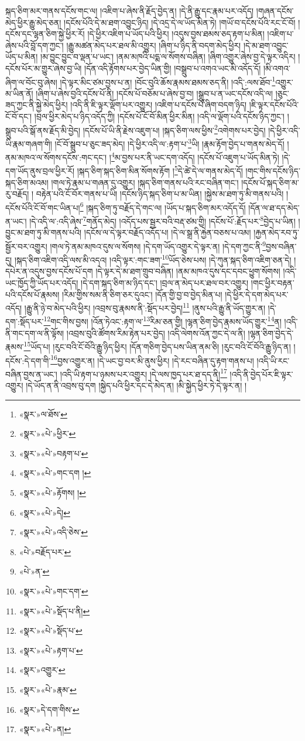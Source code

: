 སྐད་ཅིག་མར་གནས་དངོས་གང་ལ། །འཇིག་པ་ཞེས་ནི་རྗོད་བྱེད་ན། །དེ་ནི་རྒྱུ་དང་རྣམ་པར་འདོད། །གཞན་དངོས་མེད་ཕྱིར་རྒྱུ་མེད་ཅན། །དངོས་པོའི་དེ་མ་ཐག་འབྱུང་ཉིད། །དེ་འདྲ་དེ་ལ་ཡོད་མིན་ཏེ། །གཡོ་བ་དངོས་པོའི་རང་ངོ་བོ། །དངོས་དང་ལྷན་ཅིག་སྐྱེ་ཕྱིར་རོ། །དེ་ཕྱིར་འཇིག་པ་ཡོད་པའི་ཕྱིར། །འདུས་བྱས་ཐམས་ཅད་རྟག་པ་མིན། །འཇིག་པ་ཞེས་པའི་བློ་དག་ཀྱང་། །རྒྱུ་མཚན་མེད་པར་ཐལ་མི་འགྱུར། །ཞིག་པ་ཉིད་ནི་བདག་མེད་ཕྱིར། །དེ་མ་ཐག་འབྱུང་ཡོད་པ་མིན། །མ་བྱུང་བྱུང་བ་ལྡན་པ་ཡང་། །ནམ་མཁའི་པདྨ་ལ་སོགས་བཞིན། །ཞིག་འགྱུར་ཞེས་བྱ་དེ་ལྟར་འདིར། །དངོས་པོར་མ་གྱུར་ཞེས་བྱ་ཡི། །དོན་འདི་རྟོགས་པར་བྱེད་ཡིན་གྱི། །བསྒྲུབ་པ་འགའ་ཡང་མི་འདོད་དོ། །མི་འགའ་ཞིག་ལ་བོང་བུ་ཞེས། །དེ་ལྟར་མིང་ཙམ་བྱས་པ་ན། །བོང་བུའི་ཆོས་རྣམས་ཐམས་ཅད་ནི། །འདི་:ལས་ཐོབ་\footnote{«སྣར་»ལ་ཐོས་}འགྱུར་མ་ཡིན་ནོ། །ཞིག་པ་ཞེས་བྱའི་དངོས་པོ་ནི། །དངོས་པོ་བཅོམ་པ་ཞེས་བྱ་བ། །སྒྲུབ་པ་ན་ཡང་དངོས་འདི་ལ། །ཅུང་ཟད་ཀྱང་ནི་སྐྱེ་མེད་ཕྱིར། །འདི་ནི་ཇི་ལྟར་ལྡོག་པར་འགྱུར། །འཇིག་པ་དངོས་པོ་ཞིག་བདག་ཉིད། །ཇི་ལྟར་དངོས་པོའི་ངོ་བོ་དང་། །བྲལ་ཕྱིར་མེད་པ་ཉིད་འདོད་ཀྱི། །དངོས་པོ་ངོ་བོ་མིན་ཕྱིར་མིན། །འདི་ལ་ལྡོག་པའི་དངོས་ཉིད་ཀྱང་། །སྒྲུབ་པའི་སྒོ་ནས་རྗོད་མི་བྱེད། །དངོས་པོ་ཡི་ནི་རྗེས་འཇུག་པ། །སྐད་ཅིག་ལས་ཕྱིས་\footnote{«སྣར་»«པེ་»ཕྱིར་}འགེགས་པར་བྱེད། །དེ་ཕྱིར་འདི་ཡི་རྣམ་གཞག་གི། །ངོ་བོ་སྒྲུབ་པ་ཅུང་ཟད་མེད། །དེ་ཕྱིར་འདི་ལ་:རྟག་པ་\footnote{«སྣར་»«པེ་»བརྟག་པ་}ཡི། །རྣམ་རྟོག་བྱེད་པ་གནས་མེད་དོ། །ནམ་མཁའ་ལ་སོགས་དངོས་:གང་དང་། །\footnote{«སྣར་»«པེ་»གང་དག །}མ་བྱས་པར་ནི་ཡང་དག་འདོད། །དངོས་པོ་འཇུག་པ་ཡོད་མིན་ཏེ། །དེ་དག་ཡོད་ནུས་བྲལ་ཕྱིར་རོ། །སྐད་ཅིག་སྐད་ཅིག་མིན་སོགས་རྟོག །\footnote{«སྣར་»«པེ་»རྟོགས། །}དེ་ཚེ་དེ་ལ་གནས་མེད་དོ། །གང་གིས་དངོས་ཉིད་སྐད་ཅིག་མའམ། །གལ་ཏེ་རྣམ་པ་གཞན་དུ་འགྱུར། །སྐད་ཅིག་གནས་པའི་རང་བཞིན་གང་། །དངོས་པོ་སྐད་ཅིག་མ་རུ་བརྗོད། །
བརྟེན་པའི་ངོ་བོར་གནས་པ་ཡི། །དངོས་ཉིད་སྐད་ཅིག་པ་མ་ཡིན། །སྐྱེས་མ་ཐག་ཏུ་མི་གནས་པའི། །དངོས་པོའི་ངོ་བོ་གང་ཡིན་པ།\footnote{«སྣར་»«པེ་»དེ།} །སྐད་ཅིག་ཏུ་བརྗོད་དེ་གང་ལ། །ཡོད་པ་སྐད་ཅིག་མར་འདོད་དོ། །དོན་ལ་ཐ་དད་མེད་ན་ཡང་། །དེ་འདི་ལ་:འདི་ཞེས་\footnote{«སྣར་»«པེ་»འདི་ཅེས་}གནོད་མེད། །འདོད་པས་སྦྱར་བའི་བརྡ་ཙམ་གྱི། །དངོས་པོ་:རྗོད་པར་\footnote{«པེ་»བརྗོད་པར་}བྱེད་པ་ཡིན། །བྱུང་མ་ཐག་ཏུ་མི་གནས་པའི། །དངོས་ལ་དེ་ལྟར་བརྗོད་འདོད་པ། །དེ་ལ་སྒྲ་ནི་རྐྱེན་བཅས་པ་འམ། །རྐྱན་མེད་རབ་ཏུ་སྦྱོར་བར་འགྱུར། །གལ་ཏེ་ནམ་མཁའ་དུས་ལ་སོགས། །དེ་དག་ཡོད་འགྱུར་དེ་ལྟར་ན། །དེ་དག་ཀྱང་ནི་\footnote{«པེ་»ན་}བྱས་བཞིན་དུ། །སྐད་ཅིག་འཇིག་འདི་ལས་མི་འདའ། །འདི་ལྟར་:གང་ཟག་\footnote{«སྣར་»«པེ་»གང་དག་}ཡོད་ཅེས་པས། །དེ་ཀུན་སྐད་ཅིག་འཇིག་ཅན་དེ། །དཔེར་ན་འདུས་བྱས་དངོས་པོ་དག །དེ་ལྟར་དེ་མ་ཐག་གྲུབ་བཞིན། །ནམ་མཁའ་དུས་དང་དབང་ཕྱུག་སོགས། །འདི་ཡང་ཁྱོད་ཀྱི་ཡོད་པར་འདོད། །དེ་དག་སྐད་ཅིག་མ་ཉིད་དང་། །བྲལ་ན་མེད་པར་ཐལ་བར་འགྱུར། །གང་ཕྱིར་བརྟན་པའི་དངོས་པོ་རྣམས། །རིམ་གྱིས་སམ་ནི་ཅིག་ཅར་དུའང་། །དོན་གྱི་བྱ་བ་བྱེད་མིན་པ། །དེ་ཕྱིར་དེ་དག་མེད་པར་འདོད། །རྒྱུ་ནི་ཉེ་བ་མེད་པའི་ཕྱིར། །འབྲས་བུ་རྣམས་ནི་:སྡོད་པར་བྱེད།\footnote{«སྣར་»«པེ་»སྡོད་པ་ནི།} །ནུས་པའི་རྒྱུ་ནི་ཡོད་གྱུར་ན། །དེ་དག་:སྡོད་པར་\footnote{«སྣར་»«པེ་»སྡོད་པ་}གང་གིས་བྱས། །འོན་ཏེའང་:རྟག་ལ་\footnote{«སྣར་»«པེ་»རྟག་པ་}རིམ་ཅན་གྱི། །ལྷན་ཅིག་བྱེད་རྣམས་ཡོད་གྱུར་\footnote{«སྣར་»འགྱུར་}ན། །འདི་ནི་གང་དག་ལ་ནི་ལྟོས། །འབྲས་བུའི་ཚོགས་རིམ་རྟེན་པར་བྱེད། །འདི་ལེགས་འོན་ཀྱང་དེ་ལ་ནི། །ལྷན་ཅིག་བྱེད་དེ་རྣམས་\footnote{«སྣར་»«པེ་»རྣམ་}ཡོད་པ། །རུང་བའི་ངོ་བོའི་རྒྱུ་ཉིད་ཕྱིར། །དོན་གཅིག་བྱེད་པས་ཡིན་ནམ་ཅི། །རུང་བའི་ངོ་བོའི་རྒྱུ་ཉིད་ན། །དངོས་:དེ་དག་གི་\footnote{«སྣར་»དེ་དག་གིས་}བྱས་འགྱུར་ན། །དེ་ཡང་བྱ་བར་མི་ནུས་ཕྱིར། །དེ་རང་བཞིན་དུ་རྟག་གནས་པ། །འདི་ཡི་རང་བཞིན་བྱས་ན་ཡང་། །འདི་ཡི་རྟག་པ་ཉམས་པར་འགྱུར། །དེ་ལས་ཁྱད་པར་ཐ་དད་ནི།\footnote{«སྣར་»«པེ་»ན།} །འདི་ནི་བྱེད་པོར་ཇི་ལྟར་འགྱུར། །དེ་ཡོད་ན་ནི་འབྲས་བུ་དག །སྐྱེད་པའི་ཕྱིར་དང་དེ་མེད་ན། །མི་སྐྱེད་ཕྱིར་ཏེ་དེ་ལྟར་ན། །
